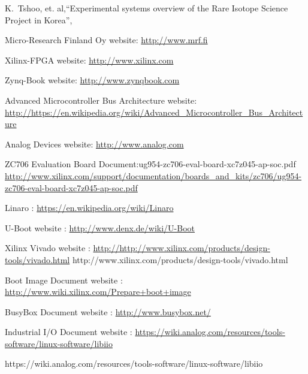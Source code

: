 \documentclass[a4paper,
              ]{jacow}
\begin{document}
%
%
\iftrue   %
	\raggedend
\fi

\iffalse  %
	\printbibliography

\else

\begin{thebibliography}{9}   %

 K.~Tshoo,{ et. al},``Experimental systems overview of the Rare Isotope Science Project in Korea'',

	Micro-Research Finland Oy website:
	\url{http://www.mrf.fi}%

Xilinx-FPGA website:
\url{http://www.xilinx.com}

Zynq-Book website:
\url{http://www.zynqbook.com}


Advanced Microcontroller Bus Architecture website:
\url{http://https://en.wikipedia.org/wiki/Advanced_Microcontroller_Bus_Architecture}


Analog Devices website:
\url{http://www.analog.com}

ZC706 Evaluation Board Document:ug954-zc706-eval-board-xc7z045-ap-soc.pdf
\url{http://www.xilinx.com/support/documentation/boards_and_kits/zc706/ug954-zc706-eval-board-xc7z045-ap-soc.pdf}

Linaro :
\url{https://en.wikipedia.org/wiki/Linaro}

U-Boot website :
\url{http://www.denx.de/wiki/U-Boot}


Xilinx Vivado website :
\url{http://http://www.xilinx.com/products/design-tools/vivado.html}
http://www.xilinx.com/products/design-tools/vivado.html

Boot Image Document website :
\url{http://www.wiki.xilinx.com/Prepare+boot+image}

BusyBox Document website :
\url{http://www.busybox.net/}

Industrial I/O Document website :
\url{https://wiki.analog.com/resources/tools-software/linux-software/libiio}

https://wiki.analog.com/resources/tools-software/linux-software/libiio
\end{thebibliography}

\fi
\end{document}
